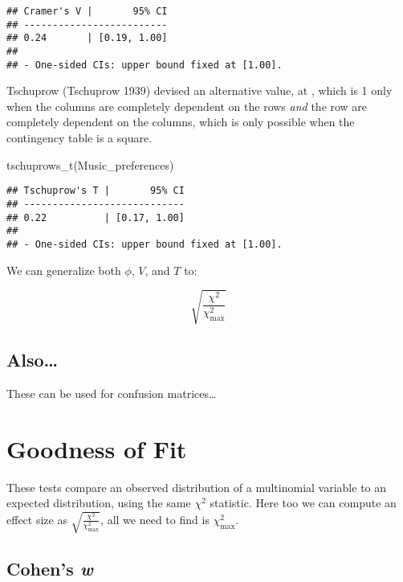 \documentclass[
]{article}
\newenvironment{Shaded}{\begin{snugshade}}{\end{snugshade}}
\newcommand{\FunctionTok}[1]{\textcolor[rgb]{0.00,0.00,0.00}{#1}}
\newcommand{\NormalTok}[1]{#1}
\begin{document}
\begin{verbatim}
## Cramer's V |       95% CI
## -------------------------
## 0.24       | [0.19, 1.00]
## 
## - One-sided CIs: upper bound fixed at [1.00].
\end{verbatim}

Tschuprow (Tschuprow 1939) devised an alternative value, at , which is 1
only when the columns are completely dependent on the rows \emph{and}
the row are completely dependent on the columns, which is only possible
when the contingency table is a square.

\begin{Shaded}
\begin{Highlighting}[]
\FunctionTok{tschuprows\_t}\NormalTok{(Music\_preferences)}
\end{Highlighting}
\end{Shaded}

\begin{verbatim}
## Tschuprow's T |       95% CI
## ----------------------------
## 0.22          | [0.17, 1.00]
## 
## - One-sided CIs: upper bound fixed at [1.00].
\end{verbatim}

We can generalize both \(\phi\), \(V\), and \(T\) to:

\[
\sqrt{\frac{\chi^2}{\chi^2_{\text{max}}}}
\]

\hypertarget{also}{%
\subsection{Also\ldots{}}\label{also}}

These can be used for confusion matrices\ldots{}

\hypertarget{goodness-of-fit}{%
\section{Goodness of Fit}\label{goodness-of-fit}}

These tests compare an observed distribution of a multinomial variable
to an expected distribution, using the same \(\chi^2\) statistic. Here
too we can compute an effect size as
\(\sqrt{\frac{\chi^2}{\chi^2_{\text{max}}}}\), all we need to find is
\(\chi^2_{\text{max}}\).

\hypertarget{cohens-w}{%
\subsection{\texorpdfstring{Cohen's
\emph{w}}{Cohen's w}}\label{cohens-w}}
\end{document}
